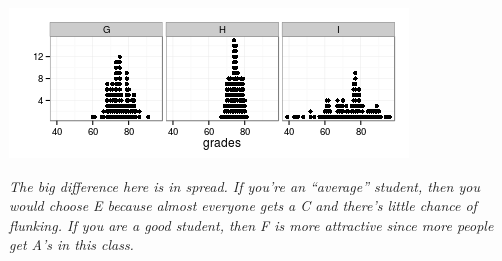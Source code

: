 \begin{enumerate}
    \includegraphics[width=.7\linewidth]{../plots/3classGradeCompareSD.png}
\begin{students}
    \vspace{2cm}
\end{students}

\begin{key}
  {\it The big difference here is in spread.  If you're an ``average''
  student, then you would choose E because almost everyone gets a C and
  there's little chance of flunking.  If you are a good student, then
  F is more attractive since more people get A's in this class.}
\end{key}



\end{enumerate}
